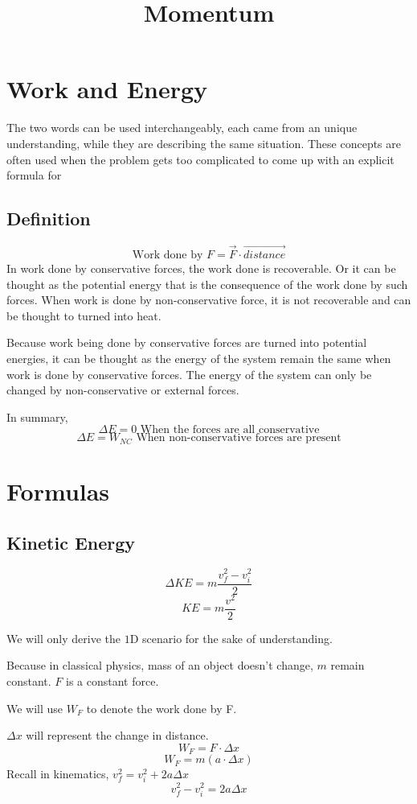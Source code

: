 \documentclass[]{article}
\title{Momentum}
\author{}
\begin{document}
\maketitle
\section{Work and Energy}
The two words can be used interchangeably, each came from an unique understanding, while they are describing the same situation. These concepts are often used when the problem gets too complicated to come up with an explicit formula for  

\subsection{Definition}
	$$\text{Work done by } F = \vec{F} \cdot \vec{distance}$$
	In work done by conservative forces, the work done is recoverable. Or it can be thought as the potential energy that is the consequence of the work done by such forces.
	When work is done by non-conservative force, it is not recoverable and can be thought to turned into heat. 

	Because work being done by conservative forces are turned into potential energies, it can be thought as the energy of the system remain the same when work is done by conservative forces. The energy of the system can only be changed by non-conservative or external forces.
	
	In summary,
	$$\Delta E = 0 \text{ When the forces are all conservative}$$
	$$\Delta E = W_{NC} \text{ When non-conservative forces are present}$$ 
\section{Formulas}	
	\subsection{Kinetic Energy}
	$$\Delta KE = m \frac{v_f^2 - v^2_i}{2}$$
	$$KE = m\frac{v^2}{2}$$

	We will only derive the $1$D scenario for the sake of understanding. 
	
	Because in classical physics, mass of an object doesn't change, $m$ remain constant.
	$F$ is a constant force.
	
	We will use $W_F$ to denote the work done by F.
	
	$\Delta x$ will represent  the change in distance.
	$$W_F = F \cdot \Delta x$$
	$$W_F = m (a \cdot \Delta x)$$
	Recall in kinematics, $v_f^2 = v^2_i + 2a\Delta x$
	$$v_f^2 - v^2_i = 2a\Delta x$$
	
\end{document}
